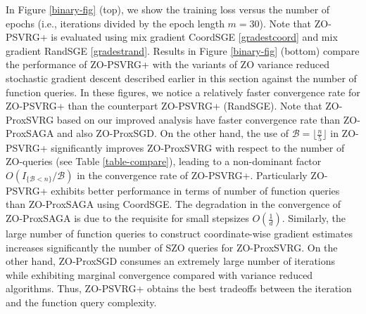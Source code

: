In Figure \ref{binary-fig} (top), we show the training loss versus the number of epochs (i.e., iterations divided by the
epoch length $m = 30$). Note that ZO-PSVRG+ is evaluated using mix gradient CoordSGE \eqref{gradestcoord} and mix gradient RandSGE \eqref{gradestrand}.
Results in Figure \ref{binary-fig} (bottom) compare the performance of ZO-PSVRG+ with the variants of ZO variance reduced stochastic gradient descent described earlier in this section against the number of function queries. In these figures, we notice  a relatively faster convergence rate for ZO-PSVRG+ than the counterpart ZO-PSVRG+ (RandSGE). Note that ZO-ProxSVRG based on
our improved analysis have faster
convergence rate than ZO-ProxSAGA and also ZO-ProxSGD. On the other hand, the use of $\mathcal{B} = \lfloor{\frac{n}{5}}\rfloor$ in ZO-PSVRG+ significantly
improves ZO-ProxSVRG with respect to the number of ZO-queries (see Table \ref{table-compare}), leading to a non-dominant factor $O(I_{\{\mathcal{B} < n\}}/\mathcal{B})$ in the convergence rate of ZO-PSVRG+. Particularly ZO-PSVRG+ exhibits better performance in terms of number of function queries than ZO-ProxSAGA using CoordSGE.  The degradation in the convergence of ZO-ProxSAGA  is due to the requisite for small stepsizes $O(\frac{1}{d})$. Similarly, the large number of function queries to construct
coordinate-wise gradient estimates increases significantly the number of SZO queries for ZO-ProxSVRG. On the other hand, ZO-ProxSGD consumes an extremely large number of iterations while exhibiting marginal convergence compared with variance reduced algorithms. Thus, ZO-PSVRG+ obtains the best tradeoffs between the iteration and the function query complexity.





